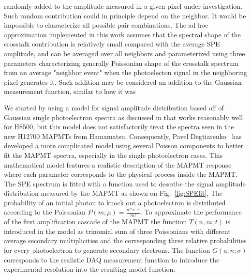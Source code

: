 randomly added to the amplitude measured in a given pixel under investigation. Such random contribution could in principle depend on the neighbor. It would be impossible to characterize all possible pair combinations. The ad hoc approximation implemented in this work assumes that the spectral shape of the crosstalk contribution is relatively small compared with the average SPE amplitude, and can be averaged over all neighbors and parameterized using three parameters characterizing generally Poissonian shape of the crosstalk spectrum from an average "neighbor event" when the photoelecton signal in the neighboring pixel generates it. Such addition may be considered an addition to the Gaussian measurement function, similar to how it was  


 
We started by using a model for signal amplitude distribution based off of Gaussian single photoelectron spectra as discussed in \cite{Bellamy:1994bv} that works reasonably well for H8500, but this model does not satisfactorily treat the spectra seen in the new H12700 MAPMTs from Hamamatsu. Consequently, Pavel Degtiarenko~\cite{DEGTIARENKO20171} has developed a more complicated model using several Poisson components to better fit the MAPMT spectra, especially in the single photoelectron cases.
This mathematical model features a realistic description of the MAPMT response where each parameter corresponds to the physical process inside the MAPMT.
The SPE spectrum is fitted with a function used to describe the signal amplitude distribution measured by the MAPMT as shown on Fig.~\ref{fig:SPEfit},
The probability of an initial photon to knock out a photoelectron is distributed according to the Poissonian $P(m;\mu)=\frac{\mu^me^{-\mu}}{m!}$.
To approximate the performance of the first amplification cascade of the MAPMT the function $T(n,m;t)$ is introduced in the model as trinomial sum of three Poissonians with different average secondary multiplicities and the corresponding three relative probabilities for every photoelectron to generate secondary electrons.
The function $G(a,n;\sigma)$ corresponds to the realistic DAQ measurement function to introduce the experimental resolution into the resulting model function.

